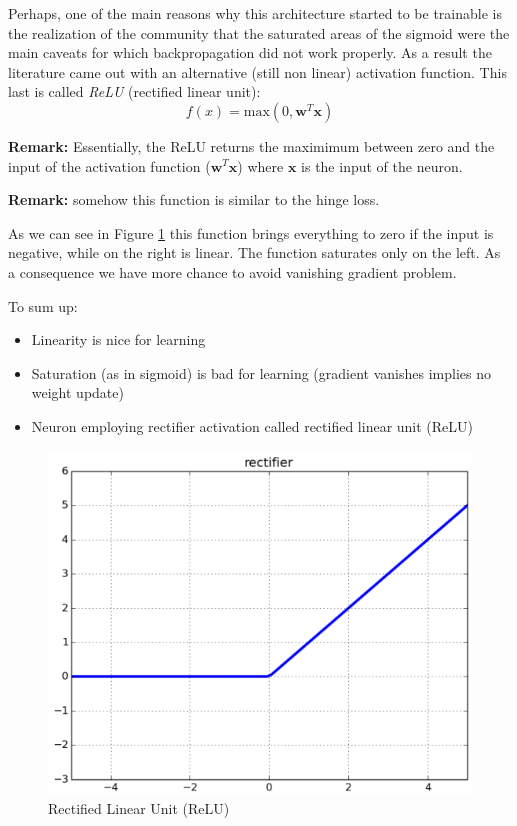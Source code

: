 Perhaps, one of the main reasons why this architecture started to be trainable is the realization of the community that the saturated areas of the sigmoid were the main caveats for which backpropagation did not work properly. As a result the literature came out with an alternative (still non linear) activation function. This last is called \textit{ReLU} (rectified linear unit):
\begin{equation}
    f(x) = \text{max}(0, \pmb{w}^T \pmb{x})
\end{equation}

\textbf{Remark:} Essentially, the ReLU returns the maximimum between zero and the input of the activation function ($\pmb{w}^T \pmb{x}$) where $\pmb{x}$ is the input of the neuron. \newline

\textbf{Remark:} somehow this function is similar to the hinge loss. \newline

As we can see in Figure \ref{fig:relu} this function brings everything to zero if the input is negative, while on the right is linear. The function saturates only on the left. As a consequence we have more chance to avoid vanishing gradient problem. \newline

To sum up:
\begin{itemize}
    \item Linearity is nice for learning
    \item Saturation (as in sigmoid) is bad for learning (gradient vanishes implies no weight update)
    \item Neuron employing rectifier activation called rectified linear unit (ReLU)
\end{itemize}

\begin{figure}
    \centering
    \includegraphics[scale=0.5]{images/relu.png}
    \caption{Rectified Linear Unit (ReLU)}
    \label{fig:relu}
\end{figure}

